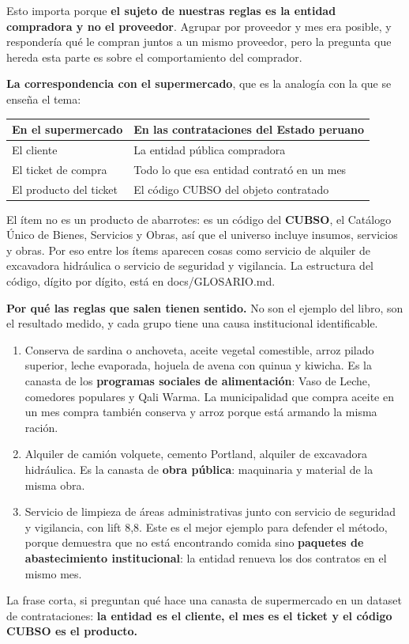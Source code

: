 \documentclass[11pt]{article}
\begin{document}
Esto importa porque \textbf{el sujeto de nuestras reglas es la entidad compradora y no el proveedor}. Agrupar por proveedor y mes era posible, y respondería qué le compran juntos a un mismo proveedor, pero la pregunta que hereda esta parte es sobre el comportamiento del comprador.

\textbf{La correspondencia con el supermercado}, que es la analogía con la que se enseña el tema:

\begin{center}\footnotesize
\begin{tabularx}{\linewidth}{Q{0.687}Q{1.312}}
\toprule
\textbf{En el supermercado} & \textbf{En las contrataciones del Estado peruano} \\
\midrule
El cliente & La entidad pública compradora \\
El ticket de compra & Todo lo que esa entidad contrató en un mes \\
El producto del ticket & El código CUBSO del objeto contratado \\
\bottomrule
\end{tabularx}
\end{center}
El ítem no es un producto de abarrotes: es un código del \textbf{CUBSO}, el Catálogo Único de Bienes, Servicios y Obras, así que el universo incluye insumos, servicios y obras. Por eso entre los ítems aparecen cosas como servicio de alquiler de excavadora hidráulica o servicio de seguridad y vigilancia. La estructura del código, dígito por dígito, está en docs/GLOSARIO.md.

\textbf{Por qué las reglas que salen tienen sentido.} No son el ejemplo del libro, son el resultado medido, y cada grupo tiene una causa institucional identificable.

\begin{enumerate}
  \item Conserva de sardina o anchoveta, aceite vegetal comestible, arroz pilado superior, leche evaporada, hojuela de avena con quinua y kiwicha. Es la canasta de los \textbf{programas sociales de alimentación}: Vaso de Leche, comedores populares y Qali Warma. La municipalidad que compra aceite en un mes compra también conserva y arroz porque está armando la misma ración.
  \item Alquiler de camión volquete, cemento Portland, alquiler de excavadora hidráulica. Es la canasta de \textbf{obra pública}: maquinaria y material de la misma obra.
  \item Servicio de limpieza de áreas administrativas junto con servicio de seguridad y vigilancia, con lift 8,8. Este es el mejor ejemplo para defender el método, porque demuestra que no está encontrando comida sino \textbf{paquetes de abastecimiento institucional}: la entidad renueva los dos contratos en el mismo mes.
\end{enumerate}
La frase corta, si preguntan qué hace una canasta de supermercado en un dataset de contrataciones: \textbf{la entidad es el cliente, el mes es el ticket y el código CUBSO es el producto.}
\end{document}
